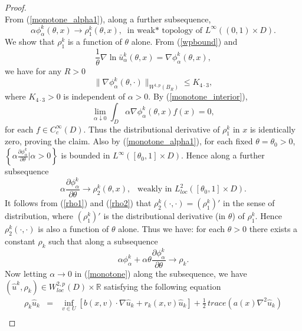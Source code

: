 \documentclass[11pt]{amsart}
\numberwithin{equation}{section}
\begin{document}
\begin{proof}
$$$$
From (\ref{monotone_alpha1}), along a further subsequence,
\begin{equation}\label{rho1}
 \alpha \phi^k_{\alpha}(\theta,x) \longrightarrow \rho^k_1(\theta,x), \ \mbox{ in weak* topology of } L^{\infty}( (0,1)\times D ).
\end{equation}
We show that $\rho^k_1$ is a function of $\theta$ alone. From (\ref{wpbound})  and $$\displaystyle{ \frac{1}{\theta} \nabla \ln \bar u^k_{\alpha}(\theta,x)= \nabla \phi^k_{\alpha}(\theta,x) ,}$$ we have for any $R>0$ %
\begin{equation}\label{monotone_interior}
\|\nabla \phi^k_{\alpha}(\theta,\cdot)\|_{W^{1,p}(B_R)} \leq K_{4 \cdot 3}, 
\end{equation}
where $K_{4 \cdot 3}>0$ is independent of $\alpha >0$. By  (\ref{monotone_interior}),
$$
\lim_{\alpha \downarrow 0} \int_{D} \alpha \nabla \phi^k_{\alpha}(\theta,x) f(x)=0,
$$
for each $f\in C^{\infty}_c(D)$. 
Thus the distributional derivative of $\rho^k_1$ in $x$ is identically zero, proving the claim. Also by  
(\ref{monotone_alpha1}), for each fixed $\theta=\theta_0>0$, $\displaystyle{ \left\{
 \alpha \frac{\partial \phi_{\alpha}^k}{\partial \theta} \Big| \alpha>0 \right\} }$ is bounded in $ L^{\infty}( [\theta_0,1]
\times D)$. Hence along a further subsequence 
\begin{equation}\label{rho2}
 \alpha \frac{\partial \phi^k_{\alpha}}{\partial \theta} \longrightarrow \rho_2^k(\theta,x), 
\ \ \mbox{ weakly in } L^{2}_{ loc }( [\theta_0,1]\times D).
\end{equation}
It follows from (\ref{rho1}) and (\ref{rho2}) that $\rho_2^k(\cdot,\cdot)=(\rho^k_1)'$ in the sense of distribution, where $(\rho^k_1)'$
is the distributional derivative (in $\theta$) of $\rho_1^k$. Hence $\rho_2^k(\cdot,\cdot)$ is also a function of $\theta$ alone.
Thus we have: for each $\theta>0$ there exists a constant $\rho_k$ such that along a subsequence
$$
\alpha \phi_{\alpha}^k+ \alpha \theta\frac{\partial \phi_{\alpha}^k}{\partial \theta} \longrightarrow \rho_k.
$$
Now letting $\alpha \longrightarrow 0$ in (\ref{monotone}) along the subsequence, we have $(\hat{u}^k, \rho_k) \in  W^{2,p}_{loc}(D) \times \mathbb{R}$ satisfying the 
following equation 
\begin{equation}
\left.
\begin{array}{rcl}\label{monotone_ergodic}
 \rho_k \hat u_k &=& \displaystyle{ \inf_{v \in U} \left[ b(x,v)\cdot  \nabla \hat u_k + 
 r_k(x,v)\hat u_k \right] +\frac{1}{2}\, trace (a(x)\nabla^2 \hat u_k) } \\

\end{array}
\end{equation}
\end{proof}
\end{document}
